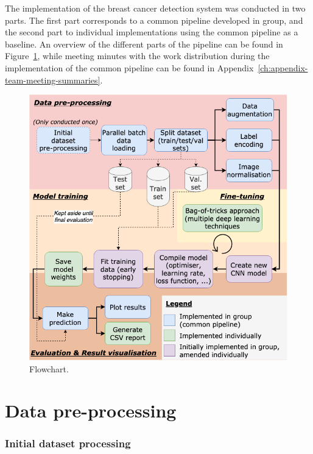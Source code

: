 The implementation of the breast cancer detection system was conducted in two parts. The first part corresponds to a common pipeline developed in group, and the second part to individual implementations using the common pipeline as a baseline. An overview of the different parts of the pipeline can be found in Figure~\ref{fig:implementation-flowchart}, while meeting minutes with the work distribution during the implementation of the common pipeline can be found in Appendix~\ref{ch:appendix-team-meeting-summaries}.

\begin{figure}[ht]
\centerline{\includegraphics[width=\textwidth]{figures/implementation/implementation flowchart.png}}
\caption{\label{fig:implementation-flowchart}Flowchart.}
\end{figure}


\section{Data pre-processing}

\subsubsection{Initial dataset processing}

